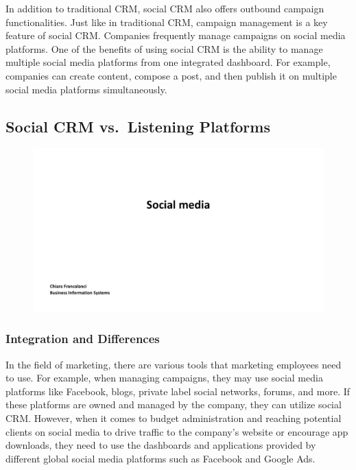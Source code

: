 In addition to traditional CRM, social CRM also offers outbound campaign
functionalities. Just like in traditional CRM, campaign management is a
key feature of social CRM. Companies frequently manage campaigns on
social media platforms. One of the benefits of using social CRM is the
ability to manage multiple social media platforms from one integrated
dashboard. For example, companies can create content, compose a post,
and then publish it on multiple social media platforms simultaneously.

\subsection{Social CRM vs.~Listening
  Platforms}\label{social-crm-vs.-listening-platforms}

\begin{figure}[!h]
  \centering
  \includegraphics[page=27, trim = 1.5cm 6cm 2.5cm 0.5cm, clip, width=\imagewidth]{images/04 - Social_Media.pdf}
\end{figure}

\subsubsection{Integration and
  Differences}\label{integration-and-differences}

In the field of marketing, there are various tools that marketing
employees need to use. For example, when managing campaigns, they may
use social media platforms like Facebook, blogs, private label social
networks, forums, and more. If these platforms are owned and managed by
the company, they can utilize social CRM. However, when it comes to
budget administration and reaching potential clients on social media to
drive traffic to the company's website or encourage app downloads, they
need to use the dashboards and applications provided by different global
social media platforms such as Facebook and Google Ads.


